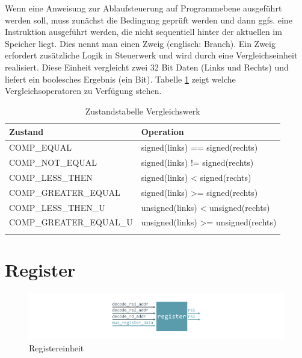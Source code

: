             Wenn eine Anweisung zur Ablaufsteuerung auf Programmebene
            ausgeführt werden soll, muss zunächst die Bedingung geprüft werden
            und dann ggfs. eine Instruktion ausgeführt werden,
            die nicht sequentiell hinter der aktuellen im Speicher liegt.
            Dies nennt man einen Zweig (englisch: Branch). Ein Zweig erfordert zusätzliche Logik in Steuerwerk 
            und wird durch eine Vergleichseinheit realisiert.
            Diese Einheit vergleicht zwei 32 Bit Daten (Links und Rechts) und liefert ein boolesches Ergebnis (ein Bit).
            Tabelle \ref{tab:comp-states} zeigt welche Vergleichsoperatoren zu Verfügung stehen.

            \begin{center}
                \begin{longtable}{| l | l | }
                    \hline
                        Zustand & Operation \\
                    \hline
                        COMP\_EQUAL & signed(links) == signed(rechts) \\
                    \hline
                        COMP\_NOT\_EQUAL & signed(links) != signed(rechts) \\
                    \hline
                        COMP\_LESS\_THEN & signed(links) < signed(rechts) \\
                    \hline
                        COMP\_GREATER\_EQUAL & signed(links) >= signed(rechts) \\
                    \hline
                        COMP\_LESS\_THEN\_U & unsigned(links) < unsigned(rechts) \\
                    \hline
                        COMP\_GREATER\_EQUAL\_U & unsigned(links) >= unsigned(rechts) \\
                    \hline
                    \caption[Zustandstabelle Vergleichswerk]{Zustandstabelle Vergleichswerk}
                    \label{tab:comp-states}
                \end{longtable}
            \end{center}
                


    \section{Register}

        \begin{figure}[H]
            \centering
            \includegraphics[scale=1]{img/block_register.pdf}
            \caption{Registereinheit}
            \label{fig:register}
        \end{figure}


